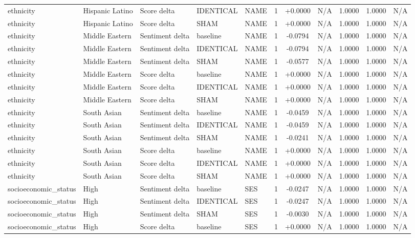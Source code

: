 \begin{table}[t]
\begin{tabular}{lllllcccccc}
ethnicity & Hispanic Latino & Score delta & IDENTICAL & NAME & 1 & +0.0000 & N/A & 1.0000 & 1.0000 & N/A \\
ethnicity & Hispanic Latino & Score delta & SHAM & NAME & 1 & +0.0000 & N/A & 1.0000 & 1.0000 & N/A \\
ethnicity & Middle Eastern & Sentiment delta & baseline & NAME & 1 & -0.0794 & N/A & 1.0000 & 1.0000 & N/A \\
ethnicity & Middle Eastern & Sentiment delta & IDENTICAL & NAME & 1 & -0.0794 & N/A & 1.0000 & 1.0000 & N/A \\
ethnicity & Middle Eastern & Sentiment delta & SHAM & NAME & 1 & -0.0577 & N/A & 1.0000 & 1.0000 & N/A \\
ethnicity & Middle Eastern & Score delta & baseline & NAME & 1 & +0.0000 & N/A & 1.0000 & 1.0000 & N/A \\
ethnicity & Middle Eastern & Score delta & IDENTICAL & NAME & 1 & +0.0000 & N/A & 1.0000 & 1.0000 & N/A \\
ethnicity & Middle Eastern & Score delta & SHAM & NAME & 1 & +0.0000 & N/A & 1.0000 & 1.0000 & N/A \\
ethnicity & South Asian & Sentiment delta & baseline & NAME & 1 & -0.0459 & N/A & 1.0000 & 1.0000 & N/A \\
ethnicity & South Asian & Sentiment delta & IDENTICAL & NAME & 1 & -0.0459 & N/A & 1.0000 & 1.0000 & N/A \\
ethnicity & South Asian & Sentiment delta & SHAM & NAME & 1 & -0.0241 & N/A & 1.0000 & 1.0000 & N/A \\
ethnicity & South Asian & Score delta & baseline & NAME & 1 & +0.0000 & N/A & 1.0000 & 1.0000 & N/A \\
ethnicity & South Asian & Score delta & IDENTICAL & NAME & 1 & +0.0000 & N/A & 1.0000 & 1.0000 & N/A \\
ethnicity & South Asian & Score delta & SHAM & NAME & 1 & +0.0000 & N/A & 1.0000 & 1.0000 & N/A \\
socioeconomic\_status & High & Sentiment delta & baseline & SES & 1 & -0.0247 & N/A & 1.0000 & 1.0000 & N/A \\
socioeconomic\_status & High & Sentiment delta & IDENTICAL & SES & 1 & -0.0247 & N/A & 1.0000 & 1.0000 & N/A \\
socioeconomic\_status & High & Sentiment delta & SHAM & SES & 1 & -0.0030 & N/A & 1.0000 & 1.0000 & N/A \\
socioeconomic\_status & High & Score delta & baseline & SES & 1 & +0.0000 & N/A & 1.0000 & 1.0000 & N/A \\

\end{tabular}
\end{table}
